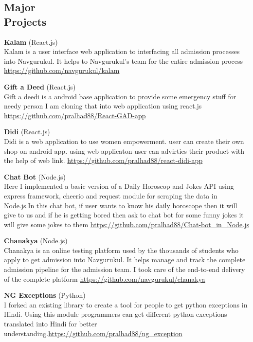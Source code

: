 \documentclass[margin,line]{resume}
\begin{document}
\begin{resume}
    \section{\color{red} \mysidestyle Major\\Projects}
    \textbf{Kalam} (React.js)
    \\ Kalam is a user interface web application to interfacing all admission processes into Navgurukul. It helps to Navgurukul’s team for the entire admission process \url{https://github.com/navgurukul/kalam}

    \textbf{Gift a Deed} (React.js)
    \\ Gift a deedi is a android base application to provide some emergency stuff for needy person I am cloning that into web application using react.js \url{https://github.com/pralhad88/React-GAD-app}
    
    \textbf{Didi} (React.js)
    \\ Didi is a web application to use women empowerment. user can create their own shop on android app. using web applicaton user can advirties their product with the help of web link. \url{https://github.com/pralhad88/react-didi-app}

    \textbf{Chat Bot} (Node.js)
    \\ Here I implemented a basic version of a Daily Horoscop and Jokes API using express framework, cheerio and request module for scraping the data in Node.js.In this chat bot, if user wants to know his daily horoscope then it will give to us and if he is getting bored then ask to chat bot for some funny jokes it will give some jokes to them \url{https://github.com/pralhad88/Chat-bot_in_Node.js}

    \textbf{Chanakya} (Node.js)
    \\ Chanakya is an online testing platform used by the thousands of students who apply to get admission into Navgurukul. It helps manage and track the complete admission pipeline for the admission team. I took care of the end-to-end delivery of the complete platform \url{https://github.com/navgurukul/chanakya}

    \newpage \textbf{NG Exceptions} (Python)
    \\ I forked an existing library to create a tool for people to get python exceptions in Hindi. Using this module programmers can get different python exceptions translated into Hindi for better understanding.\url{https://github.com/pralhad88/ng_exception}

\end{resume}
\end{document}
